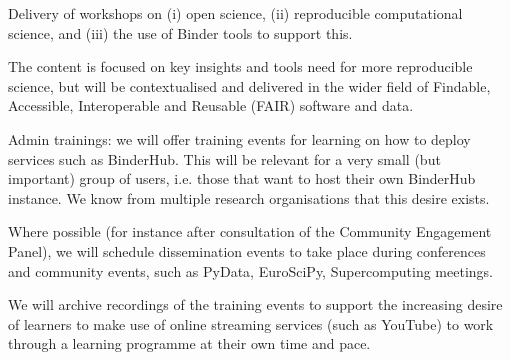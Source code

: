 \begin{task}[
  title=Training Workshops for more reproducible science,
  id=workshops,
  lead=UIO,
  PM=9,
  wphases={12-36!.25},
  partners={SRL,MP,IFR}
]
\begin{compactitem}

   \item Delivery of workshops on (i) open science, (ii) reproducible computational
     science, and (iii) the use of Binder tools to support this.

     The content is focused on key insights and tools need for more reproducible
     science, but will be contextualised and delivered in the wider field of
     Findable, Accessible, Interoperable and Reusable (FAIR) software and data.


   \item \TheProject Admin trainings: we will offer training events for learning on how to
     deploy \TheProject services such as BinderHub. This will be relevant for a
     very small (but important) group of users, i.e. those that want to host
     their own BinderHub instance. We know from multiple research organisations
     that this desire exists.

   \item Where possible (for instance after consultation of the Community Engagement Panel), 
     we will schedule dissemination events to take place
     during conferences and community events, such as PyData, EuroSciPy,
     Supercomputing meetings.

   \item We will archive recordings of the training events to support the
     increasing desire of learners to make use of online streaming services
     (such as YouTube) to work through a learning programme at their own time
     and pace.


\end{compactitem}
\end{task}

